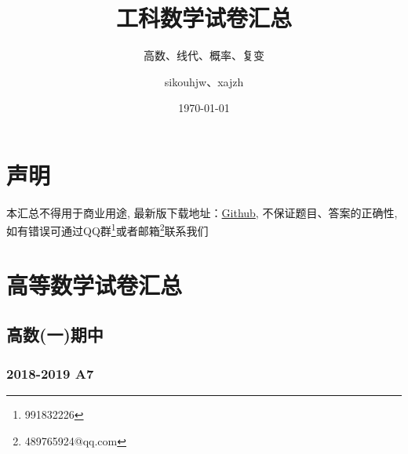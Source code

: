 \documentclass[cn,11pt,fancy,hide]{elegantbook}
\title{工科数学试卷汇总}
\subtitle{高数、线代、概率、复变}
\author{sikouhjw、xajzh}
\institute{临时组织起来的重排小组}
\date{\today}
\begin{document}
\maketitle
\tableofcontents


\mainmatter
\hypersetup{pageanchor=true}
\chapter{声明}
本汇总不得用于商业用途, 最新版下载地址：\href{https://github.com/sikouhjw/LaTeX-learning-notes/tree/master/%E9%AB%98%E6%95%B0+%E7%BA%BF%E4%BB%A3+%E6%A6%82%E7%8E%87%E9%87%8D%E6%8E%92}{Github}, 不保证题目、答案的正确性, 如有错误可通过QQ群\footnote{991832226}或者邮箱\footnote{489765924@qq.com}联系我们

\chapter{高等数学试卷汇总}

\section{高数(一)期中}

\subsection{2018-2019 A7}
\end{document}
